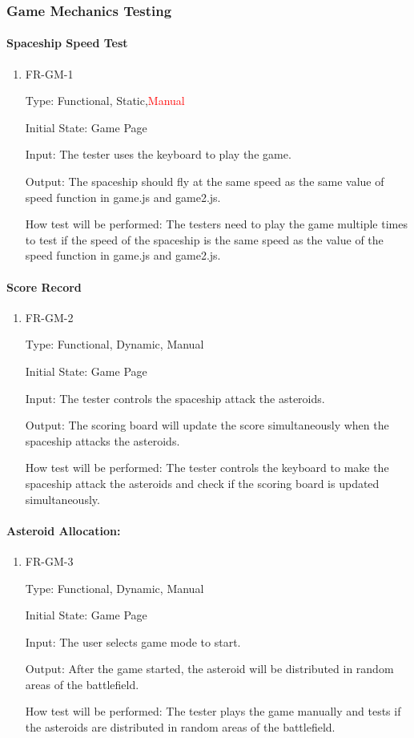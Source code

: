 \documentclass[12pt, titlepage]{article}
\begin{document}
\subsubsection{Game Mechanics Testing}
\paragraph{Spaceship Speed Test}
\begin{enumerate}					
\item{FR-GM-1\\}

Type: Functional, Static,\textcolor{red}{Manual}
					
Initial State: Game Page
					
Input: The tester uses the keyboard to play the game.
					
Output: The spaceship should fly at the same speed as the same value of speed function in game.js and game2.js. 
			
How test will be performed:  The testers need to play the game multiple times to test if the speed of the spaceship is the same speed as the value of the speed function in game.js and game2.js. 
\end{enumerate}

\paragraph{Score Record}
\begin{enumerate}					
\item{FR-GM-2\\}

Type: Functional, Dynamic, Manual
					
Initial State: Game Page
					
Input: The tester controls the spaceship attack the asteroids.
					
Output: The scoring board will update the score simultaneously when the spaceship attacks the asteroids. 
	
How test will be performed:  The tester controls the keyboard to make the spaceship attack the asteroids and check if the scoring board is updated simultaneously. 
\end{enumerate}

\paragraph{Asteroid Allocation:}
\begin{enumerate}					
\item{FR-GM-3\\}

Type: Functional, Dynamic, Manual
					
Initial State: Game Page
					
Input: The user selects game mode to start.
					
Output:  After the game started, the asteroid will be distributed in random areas of the battlefield.

How test will be performed:  The tester plays the game manually and tests if the asteroids are distributed in random areas of the battlefield. 
\end{enumerate}
\end{document}
